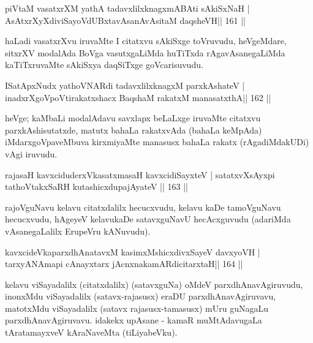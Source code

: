 \begin{shl}
piVtaM vasatxrXM yathA tadavxlilxknagxmABAti sAkiSxNaH |
AsAtxrXyXdiviSayoVdUBxtavAsanAvAsitaM daqsheVH\hfill || 161 ||
\end{shl}

\begin{artha}
haLadi vasatxrXvu iruvaMte I citatxvu sAkiSxge toVruvudu, heVgeMdare,
sitxrXV modalAda BoVga vasutxgaLiMda huTiTxda rAgavAsanegaLiMda
kaTiTxruvaMte sAkiSxya daqSiTxge goVcarisuvudu.
\end{artha}


\begin{shl}
ISatApxNudx yathoVNARdi tadavxlilxknagxM parxkAshateV |
inadxrXgoVpoV\s tirakatxshacx BaqshaM rakatxM manasatxthA\hfill || 162 ||
\end{shl}

\begin{artha}
heVge; kaMbaLi modalAdavu savxlapx beLaLxge iruvaMte citatxvu parxkAshisutatxde, matutx bahaLa rakatxvAda (bahaLa keMpAda) iMdarxgoVpaveMbuva kirxmiyaMte manasusx bahaLa rakatx (rAgadiMdakUDi) vAgi iruvudu.
\end{artha}


\begin{shl}
rajasaH kavxciduderxVkasatxmasaH kavxcidiSayxteV |
satatxvXsAyxpi tathoVtakxSaRH kutashicxdupajAyateV ||  163 ||
\end{shl}

\begin{artha}
rajoVguNavu kelavu citatxdalilx hecucxvudu, kelavu kaDe tamoVguNavu hecucxvudu, hAgeyeV kelavukaDe satavxguNavU hecAcxguvudu (adariMda vAsanegaLalilx ErupeVru kANuvudu).
\end{artha}

\begin{shl}
kavxcideVkaparxdhAnatavxM kasimxMshicxdivxSayeV davxyoVH |
tarxyANAmapi cAnayxtarx jAcnxnakamARdicitarxtaH\hfill || 164 ||
\end{shl}

\begin{artha}
kelavu viSayadalilx (citatxdalilx) (satavxguNa) oMdeV parxdhAnavAgiruvudu, inonxMdu viSayadalilx (satavx-rajasusx) eraDU parxdhAnavAgiruvavu, matotxMdu viSayadalilx (satavx rajasusx-tamasusx) mUru guNagaLu parxdhAnavAgiruvavu. idakekx upAsane - kamaR muMtAdavugaLa tAratamayxveV kAraNaveMta (tiLiyabeVku).
\end{artha}

